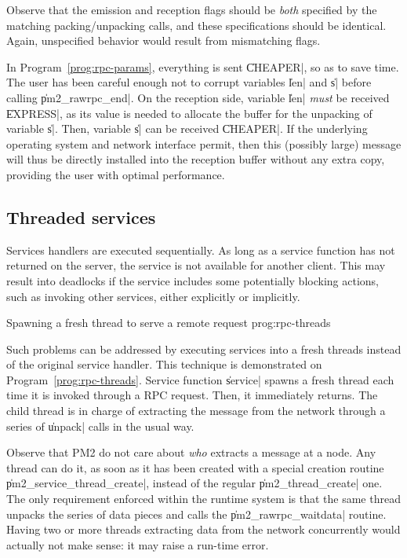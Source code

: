Observe that the emission and reception flags should be \emph{both}
specified  by the matching packing/unpacking calls, and these
specifications should be identical. Again, unspecified behavior would
result from mismatching flags.

In Program~\ref{prog:rpc-params}, everything is sent \|CHEAPER|, so as
to save time. The user has been careful enough not to corrupt
variables \|len| and \|s| before calling \|pm2_rawrpc_end|. On the
reception side, variable \|len| \emph{must} be received \|EXPRESS|, as
its value is needed to allocate the buffer for the unpacking of
variable \|s|.  Then, variable \|s| can be received \|CHEAPER|. If the
underlying operating system and network interface permit, then this
(possibly large) message will thus be directly installed into the
reception buffer without any extra copy, providing the user with
optimal performance.

\subsection{Threaded services}

Services handlers are executed sequentially. As long as a service
function has not returned on the server, the service is not available
for another client. This may result into deadlocks if the service
includes some potentially blocking actions, such as invoking other
services, either explicitly or implicitly.

 {Spawning a fresh thread to serve a
  remote request} {prog:rpc-threads}

Such problems can be addressed by executing services into a fresh
threads instead of the original service handler. This technique is
demonstrated on Program~\ref{prog:rpc-threads}. Service function
\|service| spawns a fresh thread each time it is invoked
through a RPC request. Then, it immediately returns. The child thread
is in charge of extracting the message from the network through a series
of \|unpack| calls in the usual way. 

Observe that PM2 do not care about \emph{who} extracts a message at a
node. Any thread can do it, as soon as it has been created with a
special creation routine \|pm2_service_thread_create|, instead of the
regular \|pm2_thread_create| one. The only requirement enforced within
the runtime system is that the same thread unpacks the series of data
pieces and calls the \|pm2_rawrpc_waitdata| routine. Having two or
more threads extracting data from the network concurrently would
actually not make sense: it may raise a run-time error.

